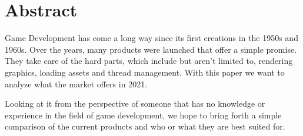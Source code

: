 

\cleardoublepage
\chapter*{Abstract}
Game Development has come a long way since its first creations in the 1950s and 1960s. 
Over the years, many products were launched that offer a simple promise. They take care of the hard parts, which include but aren't limited to, rendering graphics, loading assets and thread management. With this paper we want to analyze what the market offers in 2021. \\
\par Looking at it from the perspective of someone that has no knowledge or experience in the field of game development, we hope to bring forth a simple comparison of the current products and who or what they are best suited for.



